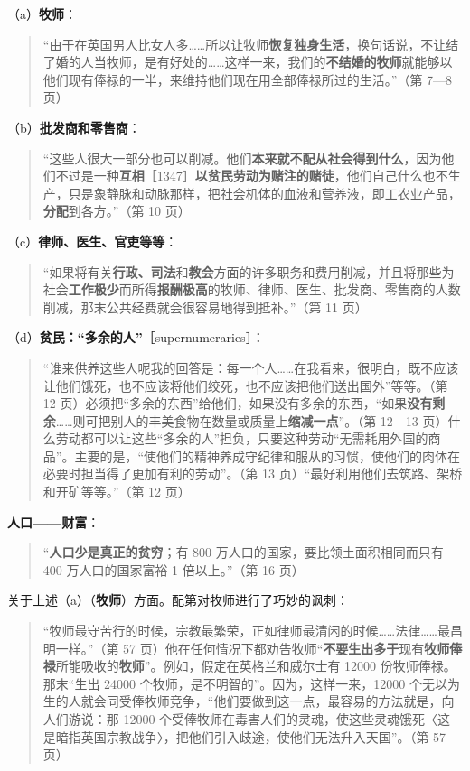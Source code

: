 （a）\textbf{牧师}：

\begin{quote}“由于在英国男人比女人多……所以让牧师\textbf{恢复独身生活}，换句话说，不让结了婚的人当牧师，是有好处的……这样一来，我们的\textbf{不结婚的牧师}就能够以他们现有俸禄的一半，来维持他们现在用全部俸禄所过的生活。”（第 7—8 页）\end{quote}

（b）\textbf{批发商和零售商}：

\begin{quote}“这些人很大一部分也可以削减。他们\textbf{本来就不配从社会得到什么}，因为他们不过是一种\textbf{互相}［1347］\textbf{以贫民劳动为赌注的赌徒}，他们自己什么也不生产，只是象静脉和动脉那样，把社会机体的血液和营养液，即工农业产品，\textbf{分配}到各方。”（第 10 页）\end{quote}

（c）\textbf{律师、医生、官吏等等}：

\begin{quote}“如果将有关\textbf{行政、司法}和\textbf{教会}方面的许多职务和费用削减，并且将那些为社会\textbf{工作极少}而所得\textbf{报酬极高}的牧师、律师、医生、批发商、零售商的人数削减，那末公共经费就会很容易地得到抵补。”（第 11 页）\end{quote}

（d）\textbf{贫民：“多余的人”}［supernumeraries］：

\begin{quote}“谁来供养这些人呢我的回答是：每一个人……在我看来，很明白，既不应该让他们饿死，也不应该将他们绞死，也不应该把他们送出国外”等等。（第 12 页）必须把“多余的东西”给他们，如果没有多余的东西，“如果\textbf{没有剩余}……则可把别人的丰美食物在数量或质量上\textbf{缩减一点}”。（第 12—13 页）什么劳动都可以让这些“多余的人”担负，只要这种劳动“无需耗用外国的商品”。主要的是，“使他们的精神养成守纪律和服从的习惯，使他们的肉体在必要时担当得了更加有利的劳动”。（第 13 页）“最好利用他们去筑路、架桥和开矿等等。”（第 12 页）\end{quote}

\textbf{人口——财富}：

\begin{quote}“\textbf{人口少是真正的贫穷}；有 800 万人口的国家，要比领土面积相同而只有 400 万人口的国家富裕 1 倍以上。”（第 16 页）\end{quote}

关于上述（a）（\textbf{牧师}）方面。配第对牧师进行了巧妙的讽刺：

\begin{quote}“牧师最守苦行的时候，宗教最繁荣，正如律师最清闲的时候……法律……最昌明一样。”（第 57 页）他在任何情况下都劝告牧师“\textbf{不要生出多于}现有\textbf{牧师俸禄}所能吸收的\textbf{牧师}”。例如，假定在英格兰和威尔士有 12000 份牧师俸禄。那末“生出 24000 个牧师，是不明智的”。因为，这样一来，12000 个无以为生的人就会同受俸牧师竞争，“他们要做到这一点，最容易的方法就是，向人们游说：那 12000 个受俸牧师在毒害人们的灵魂，使这些灵魂饿死〈这是暗指英国宗教战争〉，把他们引入歧途，使他们无法升入天国”。（第 57 页）\end{quote}


